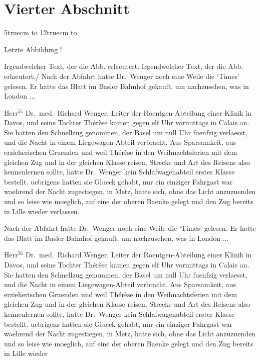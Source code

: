 \section{Vierter Abschnitt}
\begin{floatingfigure}{5truecm}%
\vbox to 12truecm%
{\vfil\hbox to \vfil}%
\caption{Letzte Abbildung !}
\end{floatingfigure}
Irgendwelcher Text, der die Abb. erlaeutert.
Irgendwelcher Text, der die Abb. erlaeutert./
%
Nach der Abfahrt hatte Dr.~Wen\-ger noch eine
Weile die `Times' gelesen. Er hatte das Blatt im
Basler Bahnhof gekauft, um nachzusehen, was in London ...\par
Herr$^{55}$ Dr.~med.~Richard Wenger, Leiter der Roent\-gen-Ab\-tei\-lung
einer Klinik in Davos, und seine
Tochter Th\'e\-r\`ese kamen gegen elf Uhr vormittags
in Calais an. Sie hatten den Schnellzug genommen,
der Basel um null Uhr fuenfzig verlaesst, und die
Nacht in einem Liege\-wagen-Abteil verbracht.
Aus Sparsamkeit, aus erzieherischen
Gruenden und weil
Th\'e\-r\`ese in den Weihnachtsferien mit dem gleichen
Zug und in der gleichen Klasse reisen, Strecke und
Art des Reisens also kennenlernen sollte, hatte Dr.~Wenger
kein Schlafwagenabteil erster Klasse bestellt.
uebrigens hatten sie Glueck gehabt, nur ein
einziger Fahrgast war waehrend der Nacht zugestiegen,
in Metz, hatte sich, ohne das Licht anzuzuenden
und so leise wie moeglich, auf eine der oberen
Baenke gelegt und den Zug bereits in Lille wieder
verlassen.\par
Nach der Abfahrt hatte Dr.~Wen\-ger noch eine
Weile die `Times' gelesen. Er hatte das Blatt im
Basler Bahnhof gekauft, um nachzusehen, was in London ...\par
Herr$^{56}$ Dr.~med.~Richard Wenger, Leiter der Roent\-gen-Ab\-tei\-lung
einer Klinik in Davos, und seine
Tochter Th\'e\-r\`ese kamen gegen elf Uhr vormittags
in Calais an. Sie hatten den Schnellzug genommen,
der Basel um null Uhr fuenfzig verlaesst, und die
Nacht in einem Liege\-wagen-Abteil verbracht.
Aus Sparsamkeit, aus erzieherischen
Gruenden und weil
Th\'e\-r\`ese in den Weihnachtsferien mit dem gleichen
Zug und in der gleichen Klasse reisen, Strecke und
Art des Reisens also kennenlernen sollte, hatte Dr.~Wenger
kein Schlafwagenabteil erster Klasse bestellt.
uebrigens hatten sie Glueck gehabt, nur ein
einziger Fahrgast war waehrend der Nacht zugestiegen,
in Metz, hatte sich, ohne das Licht anzuzuenden
und so leise wie moeglich, auf eine der oberen
Baenke gelegt und den Zug bereits in Lille wieder
